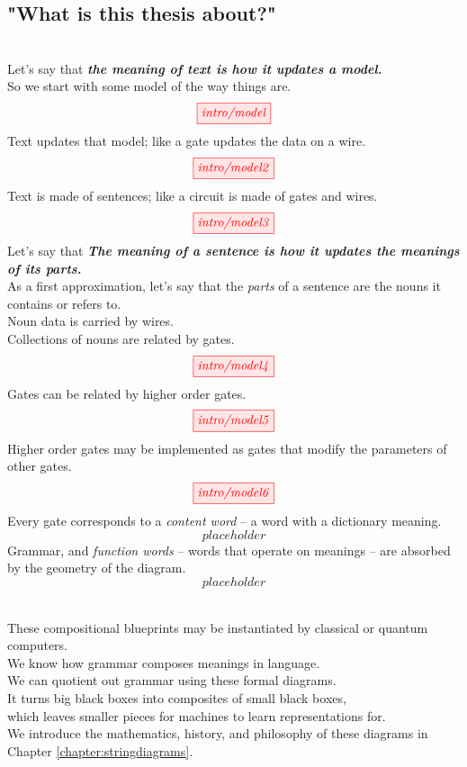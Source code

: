 \begin{fullwidth}
\begin{centering}

\section{"What is this thesis about?"}

\\
Let's say that \textbf\emph{{the meaning of text is how it updates a model.}}\\
So we start with some model of the way things are.
\[\tikzfig{intro/model}\]
Text updates that model;
like a gate updates the data on a wire.
\[\tikzfig{intro/model2}\]
Text is made of sentences;
like a circuit is made of gates and wires.
\[\tikzfig{intro/model3}\]
Let's say that \textbf{\emph{The meaning of a sentence is how it updates the meanings of its parts.}}\\
As a first approximation, let's say that the \emph{parts} of a sentence are the nouns it contains or refers to.\\
Noun data is carried by wires.\\
Collections of nouns are related by gates.
\[\tikzfig{intro/model4}\]
Gates can be related by higher order gates.
\[\tikzfig{intro/model5}\]
Higher order gates may be implemented as gates that modify the parameters of other gates.
\[\tikzfig{intro/model6}\]
Every gate corresponds to a \emph{content word} -- a word with a dictionary meaning.
\[placeholder\]
Grammar, and \emph{function words} -- words that operate on meanings -- are absorbed by the geometry of the diagram.
\[placeholder\]

\\
These compositional blueprints may be instantiated by classical or quantum computers.\\
We know how grammar composes meanings in language.\\
We can quotient out grammar using these formal diagrams.\\
It turns big black boxes into composites of small black boxes,\\
which leaves smaller pieces for machines to learn representations for.\\
We introduce the mathematics, history, and philosophy of these diagrams in Chapter \ref{chapter:stringdiagrams}.\\


\end{centering}
\end{fullwidth}
